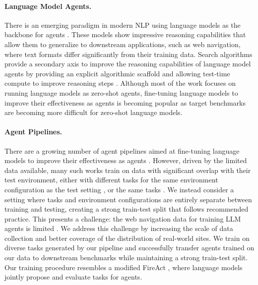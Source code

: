 \paragraph{Language Model Agents.} There is an emerging paradigm in modern NLP using language models \citep{GPT2,GPT3,Llama,Llama2} as the backbone for agents \citep{LanguageModelAgents}. These models show impressive reasoning capabilities \citep{SparksAGI,EvaluateO1,CanLRMsPlan} that allow them to generalize to downstream applications, such as web navigation, where text formats differ significantly from their training data. Search algorithms provide a secondary axis to improve the reasoning capabilities of language model agents \citep{TreeOfThoughts,GraphOfThoughts,LLMTreeSearch,LanguageAgentTreeSearch} by providing an explicit algorithmic scaffold and allowing test-time compute to improve reasoning steps \citep{ScalingTestTimeCompute,EvaluateO1}. Although most of the work focuses on running language models as zero-shot agents, fine-tuning language models to improve their effectiveness as agents is becoming popular \citep{AgentQ,AgentTuning,AppAgent,CogAgent,LLMAgentSurvey1,LLMAgentSurvey2} as target benchmarks are becoming more difficult for zero-shot language models.

\paragraph{Agent Pipelines.} There are a growing number of agent pipelines aimed at fine-tuning language models to improve their effectiveness as agents \citep{AgentInstruct,AgentTuning,AgentQ,FireAct,SynatraSyntheticData}. However, driven by the limited data available, many such works train on data with significant overlap with their test environment, either with different tasks for the same environment configuration as the test setting \citep{Mind2Web}, or the same tasks \citep{AgentQ}. We instead consider a setting where tasks and environment configurations are entirely separate between training and testing, creating a strong train-test split that follows recommended practice. This presents a challenge: the web navigation data for training LLM agents is limited \citep{Mind2Web,WebLINX}. We address this challenge by increasing the scale of data collection and better coverage of the distribution of real-world sites. We train on diverse tasks generated by our pipeline and successfully transfer agents trained on our data to downstream benchmarks while maintaining a strong train-test split. Our training procedure resembles a modified FireAct \citep{FireAct}, where language models jointly propose and evaluate tasks for agents.

